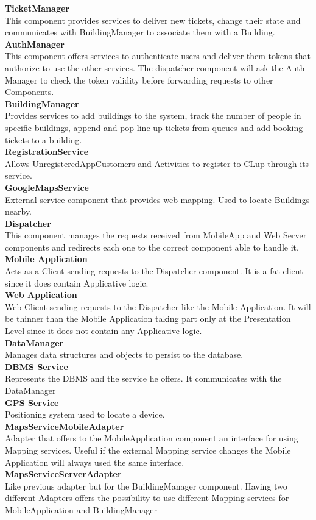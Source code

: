 \textbf{TicketManager}\\
This component provides services to deliver new tickets, change their state and communicates with BuildingManager to associate them with a Building.\\
\textbf{AuthManager}\\
This component offers services to authenticate users and deliver them tokens that authorize to use the other services. The dispatcher component will ask the Auth Manager to check the token validity before forwarding requests to other Components.\\
\textbf{BuildingManager}\\
Provides services to add buildings to the system, track the number of people in specific buildings, append and pop line up tickets from queues and add booking tickets to a building.\\
\textbf{RegistrationService}\\
Allows UnregisteredAppCustomers and Activities to register to CLup through its service.\\
\textbf{GoogleMapsService}\\
External service component that provides web mapping. Used to locate Buildings nearby.\\
\textbf{Dispatcher}\\
This component manages the requests received from MobileApp and Web Server components and redirects each one to the correct component able to handle it.\\
\textbf{Mobile Application}\\
Acts as a Client sending requests to the Dispatcher component.
It is a fat client since it does contain Applicative logic.\\
\textbf{Web Application}\\
Web Client sending requests to the Dispatcher like the Mobile Application. It will be thinner than the Mobile Application taking part only at the Presentation Level since it does not contain any Applicative logic.\\
\textbf{DataManager}\\
Manages data structures and objects to persist to the database.\\
\textbf{DBMS Service}\\
Represents the DBMS and the service he offers. It communicates with the DataManager\\
\textbf{GPS Service}\\
Positioning system used to locate a device.\\
\textbf{MapsServiceMobileAdapter}\\
Adapter that offers to the MobileApplication component an interface for using Mapping services. Useful if the external Mapping service changes the Mobile Application will always used the same interface.\\
\textbf{MapsServiceServerAdapter}\\
Like previous adapter but for the BuildingManager component. Having two different Adapters offers the possibility to use different Mapping services for MobileApplication and BuildingManager 


